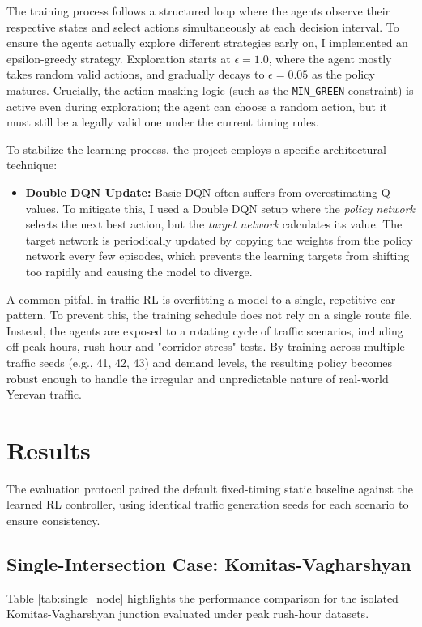 \documentclass[conference]{IEEEtran}
\begin{document}
The training process follows a structured loop where the agents observe their respective states and select actions simultaneously at each decision interval. To ensure the agents actually explore different strategies early on, I implemented an epsilon-greedy strategy. Exploration starts at $\epsilon = 1.0$, where the agent mostly takes random valid actions, and gradually decays to $\epsilon = 0.05$ as the policy matures. Crucially, the action masking logic (such as the \texttt{MIN\_GREEN} constraint) is active even during exploration; the agent can choose a random action, but it must still be a legally valid one under the current timing rules.

To stabilize the learning process, the project employs a specific architectural technique:
\begin{itemize}
    \item \textbf{Double DQN Update:} Basic DQN often suffers from overestimating Q-values. To mitigate this, I used a Double DQN setup where the \textit{policy network} selects the next best action, but the \textit{target network} calculates its value. The target network is periodically updated by copying the weights from the policy network every few episodes, which prevents the learning targets from shifting too rapidly and causing the model to diverge.
\end{itemize}

A common pitfall in traffic RL is overfitting a model to a single, repetitive car pattern. To prevent this, the training schedule does not rely on a single route file. Instead, the agents are exposed to a rotating cycle of traffic scenarios, including off-peak hours, rush hour and "corridor stress" tests. By training across multiple traffic seeds (e.g., 41, 42, 43) and demand levels, the resulting policy becomes robust enough to handle the irregular and unpredictable nature of real-world Yerevan traffic.

\section{Results}

The evaluation protocol paired the default fixed-timing static baseline against the learned RL controller, using identical traffic generation seeds for each scenario to ensure consistency.

\subsection{Single-Intersection Case: Komitas-Vagharshyan}
Table \ref{tab:single_node} highlights the performance comparison for the isolated Komitas-Vagharshyan junction evaluated under peak rush-hour datasets.
\end{document}
